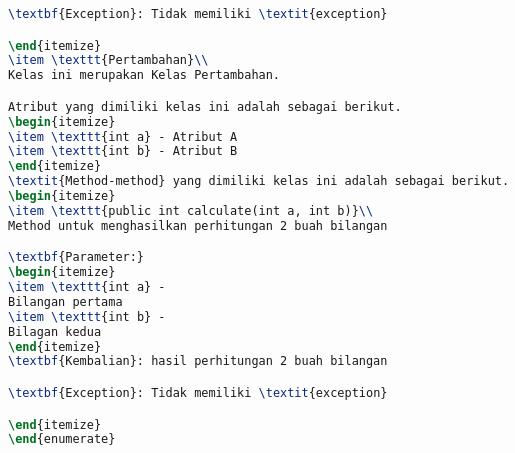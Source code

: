 \begin{lstlisting}[language=TeX, caption=Hasil pengujian kode program sederhana]
\textbf{Exception}: Tidak memiliki \textit{exception}

\end{itemize}
\item \texttt{Pertambahan}\\ 
Kelas ini merupakan Kelas Pertambahan.

Atribut yang dimiliki kelas ini adalah sebagai berikut.
\begin{itemize}
\item \texttt{int a} - Atribut A
\item \texttt{int b} - Atribut B
\end{itemize}
\textit{Method-method} yang dimiliki kelas ini adalah sebagai berikut.
\begin{itemize}
\item \texttt{public int calculate(int a, int b)}\\ 
Method untuk menghasilkan perhitungan 2 buah bilangan

\textbf{Parameter:}
\begin{itemize}
\item \texttt{int a} - 
Bilangan pertama
\item \texttt{int b} - 
Bilagan kedua
\end{itemize}
\textbf{Kembalian}: hasil perhitungan 2 buah bilangan

\textbf{Exception}: Tidak memiliki \textit{exception}

\end{itemize}
\end{enumerate}

\end{lstlisting}


